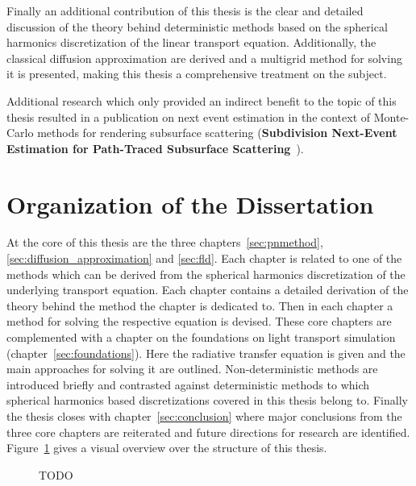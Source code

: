 Finally an additional contribution of this thesis is the clear and detailed discussion of the theory behind deterministic methods based on the spherical harmonics discretization of the linear transport equation. Additionally, the classical diffusion approximation are derived and a multigrid method for solving it is presented, making this thesis a comprehensive treatment on the subject.

Additional research which only provided an indirect benefit to the topic of this thesis resulted in a publication on next event estimation in the context of Monte-Carlo methods for rendering subsurface scattering (\textbf{Subdivision Next-Event Estimation for Path-Traced Subsurface Scattering}~\cite{Koerner16}).

\section{Organization of the Dissertation}

At the core of this thesis are the three chapters~\ref{sec:pnmethod}, \ref{sec:diffusion_approximation} and \ref{sec:fld}. Each chapter is related to one of the methods which can be derived from the spherical harmonics discretization of the underlying transport equation. Each chapter contains a detailed derivation of the theory behind the method the chapter is dedicated to. Then in each chapter a method for solving the respective equation is devised. These core chapters are complemented with a chapter on the foundations on light transport simulation (chapter~\ref{sec:foundations}). Here the radiative transfer equation is given and the main approaches for solving it are outlined. Non-deterministic methods are introduced briefly and contrasted against deterministic methods to which spherical harmonics based discretizations covered in this thesis belong to. Finally the thesis closes with chapter~\ref{sec:conclusion} where major conclusions from the three core chapters are reiterated and future directions for research are identified. Figure~\ref{fig:intro_organization} gives a visual overview over the structure of this thesis.
\begin{figure}[ht]
\centering
{}
\caption{TODO}
\label{fig:intro_organization}
\end{figure}








